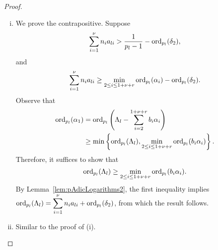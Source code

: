 \begin{proof} \
\begin{enumerate}[(i)]
\item We prove the contrapositive. Suppose
\[\sum_{i = 1}^{\nu} n_i a_{li} > \frac{1}{p_l-1} - \operatorname{ord}_{p_l}(\delta_2), \]
and
\[\sum_{i = 1}^{\nu} n_i a_{li}  \geq \displaystyle \min_{2 \leq i \leq 1+\nu+r} \operatorname{ord}_{p_l}(\alpha_{i}) - \operatorname{ord}_{p_l}(\delta_2).\]
Observe that
\begin{align*}
\operatorname{ord}_{p_l}(\alpha_{1}) 	
	& = \operatorname{ord}_{p_l}\left( \Lambda_{l} - \sum_{i = 2}^{1+\nu+r}b_i\alpha_{i}\right) \\
	& \geq \min\left\{ \operatorname{ord}_{p_l}(\Lambda_{l}), \min_{2 \leq i \leq 1+\nu+r} \operatorname{ord}_{p_l}(b_i\alpha_{i})\right\}.
\end{align*}
Therefore, it suffices to show that 
\[\operatorname{ord}_{p_l}(\Lambda_{l}) \geq \min_{2 \leq i \leq 1+\nu+r} \operatorname{ord}_{p_l}(b_i\alpha_{i}).\]
By Lemma~\ref{lem:pAdicLogarithms2}, the first inequality implies ${\operatorname{ord}_{p_l}(\Lambda_{l}) = \displaystyle \sum_{i = 1}^{\nu} n_ia_{li} + \operatorname{ord}_{p_l}(\delta_2)}$, from which the result follows. 

\item Similar to the proof of (i).
\end{enumerate}
\end{proof}


